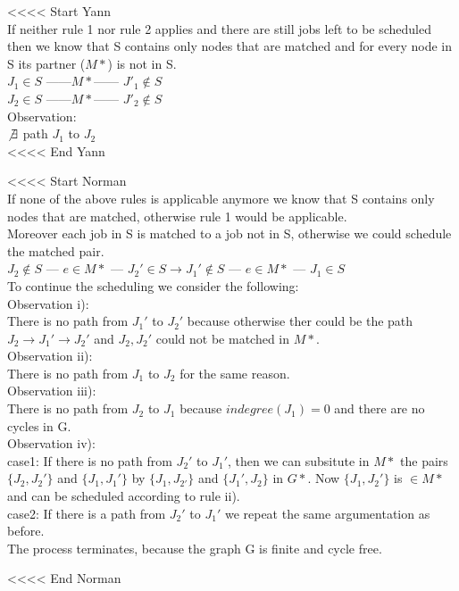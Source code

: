 <<<< Start Yann \\
If neither rule 1 nor rule 2 applies and there are still jobs left to be scheduled then we know that S contains only nodes that are matched
and for every node in S its partner ($M*$) is not in S.\\

$J{_1} \in S$ ------$M*$------
$J'{_1} \notin S$\\

$J{_2} \in S$ ------$M*$------
$J'{_2} \notin S$\\

Observation:\\
$\not\exists$ path $J_{1}$ to $J_{2}$ \\
<<<< End Yann

<<<< Start Norman \\
 If none of the above rules is applicable anymore we know that S contains only nodes that are matched, otherwise rule 1 would be applicable.\\
 Moreover each job in S is matched to a job not in S, otherwise we could schedule the matched pair. \\
  $ J_{2} \not\in S$ --- $ e\in M*$ --- $J_{2}' \in S \rightarrow J_{1}' \not\in S$  --- $ e\in M*$ --- $ J_{1} \in S$ \\
 To continue the scheduling we consider the following:\\
 Observation i):\\
 There is no path from $J_{1}'$ to $J_{2}'$ because otherwise ther could be the path $J_{2} \rightarrow J_{1}' \rightarrow J_{2}'$ and $J_{2},J_{2}'$ could not be matched in $M*$.\\
 \newline
 Observation ii):\\
 There is no path from $J_{1}$ to $J_{2}$ for the same reason. \\
 \newline
 Observation iii): \\
 There is no path from $J_{2}$ to $J_{1}$ because $indegree(J_{1})=0$ and there are no cycles in G.\\
 \newline
 Observation iv): \\
 case1: If there is no path from $J_{2}'$ to $J_{1}'$, then we can subsitute in $M*$ the pairs $\{ J_{2}, J_{2}' \}$ and  $\{ J_{1}, J_{1}' \}$ by $\{ J_{1}, J_{2'} \}$ and $\{ J_{1}', J_{2} \}$ in $G*$. Now $\{ J_{1}, J_{2}' \}$ is $\in M*$ and can be scheduled according to rule ii). \\
 case2: If there is a path from $J_{2}'$ to $J_{1}'$ we repeat the same argumentation as before. \\
 \newline
 The process terminates, because the graph G is finite and cycle free.
 
<<<< End Norman \\



